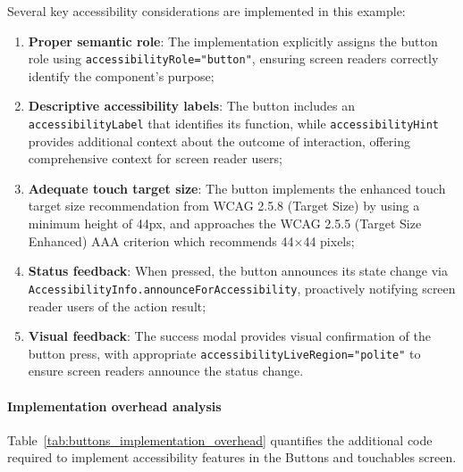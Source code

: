 Several key accessibility considerations are implemented in this example:

\begin{enumerate}
    \item \textbf{Proper semantic role}: The implementation explicitly assigns the button role using \texttt{accessibilityRole="button"}, ensuring screen readers correctly identify the component's purpose;
    
    \item \textbf{Descriptive accessibility labels}: The button includes an \texttt{accessibilityLabel} that identifies its function, while \texttt{accessibilityHint} provides additional context about the outcome of interaction, offering comprehensive context for screen reader users;
    
    \item \textbf{Adequate touch target size}: The button implements the enhanced touch target size recommendation from WCAG 2.5.8 (Target Size) by using a minimum height of 44px, and approaches the WCAG 2.5.5 (Target Size Enhanced) AAA criterion which recommends 44×44 pixels;
    
    \item \textbf{Status feedback}: When pressed, the button announces its state change via \\\texttt{AccessibilityInfo.announceForAccessibility}, proactively notifying screen reader users of the action result;
    
    \item \textbf{Visual feedback}: The success modal provides visual confirmation of the button press, with appropriate \texttt{accessibilityLiveRegion="polite"} to ensure screen readers announce the status change.
\end{enumerate}

\paragraph{Implementation overhead analysis}

Table~\ref{tab:buttons_implementation_overhead} quantifies the additional code required to implement accessibility features in the Buttons and touchables screen.

